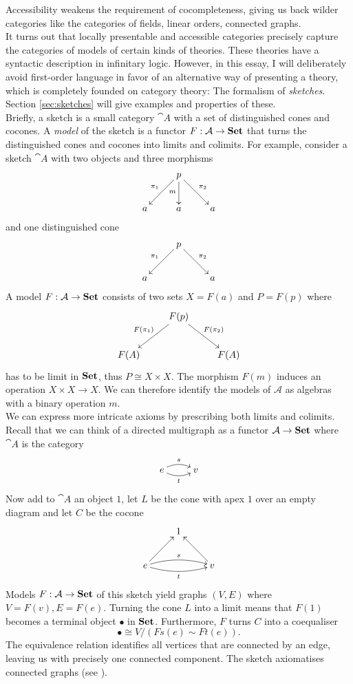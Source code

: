 Accessibility weakens the requirement of cocompleteness, giving us back wilder categories like the categories of fields, linear orders, connected graphs. \\

It turns out that locally presentable and accessible categories precisely capture the categories of models of certain kinds of theories. These theories have a syntactic description in infinitary logic. However, in this essay, I will deliberately avoid first-order language in favor of an alternative way of presenting a theory, which is completely founded on category theory: The formalism of \emph{sketches}. Section \ref{sec:sketches} will give examples and properties of these. \\

Briefly, a sketch is a small category $\cat A$ with a set of distinguished cones and cocones. A \emph{model} of the sketch is a functor $F : \mathcal{A} \to \mathbf{Set}$ that turns the distinguished cones and cocones into limits and colimits. For example, consider a sketch $\cat A$ with two objects and three morphisms
\[
\xymatrix{
  & p \ar[rd]^{\pi_2} \ar[d]_{m} \ar[ld]_{\pi_1} & \\
a & a & a
}\]
and one distinguished cone
\[
\xymatrix{
  & p \ar[rd]^{\pi_2} \ar[ld]_{\pi_1} & \\
a & & a
}\]
A model $F : \mathcal{A} \to \mathbf{Set}$ consists of two sets $X=F(a)$ and $P=F(p)$ where
\[
\xymatrix{
  & F(p) \ar[rd]^{F(\pi_2)} \ar[ld]_{F(\pi_1)} & \\
F(A) & & F(A)
}\]
has to be limit in $\mathbf{Set}$, thus $P \cong X \times X$. The morphism $F(m)$ induces an operation $X \times X \to X$. We can therefore identify the models of $\mathcal A$ as algebras with a binary operation $m$. \\

We can express more intricate axioms by prescribing both limits and colimits. Recall that we can think of a directed multigraph as a functor $\mathcal{A} \to \mathbf{Set}$ where $\cat A$ is the category
\[
\xymatrix{
e \ar@/^/[r]^{s} \ar@/_/[r]_{t} & v
}\]
Now add to $\cat A$ an object $1$, let $L$ be the cone with apex $1$ over an empty diagram and let $C$ be the cocone \[
\xymatrix{
& 1 \\
e \ar@/^/[rr]^{s} \ar@/_/[rr]_{t} \ar[ru] & & v \ar[lu] \\
}\]
Models $F: \mathcal{A} \to \mathbf{Set}$ of this sketch yield graphs $(V,E)$ where $V=F(v),E=F(e)$. Turning the cone $L$ into a limit means that $F(1)$ becomes a terminal object $\bullet$ in $\mathbf{Set}$. Furthermore, $F$ turns $C$ into a coequaliser
\[ \bullet \cong V/(Fs(e)\sim Ft(e)). \]
The equivalence relation identifies all vertices that are connected by an edge, leaving us with precisely one connected component. The sketch axiomatises connected graphs (see \cite[Example D2.1.4]{elephant}). \\

